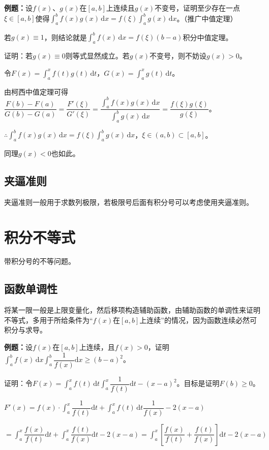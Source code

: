 \documentclass[UTF8, 12pt]{ctexart}
\begin{document}
\textbf{例题：}设$f(x)$、$g(x)$在$[a,b]$上连续且$g(x)$不变号，证明至少存在一点$\xi\in[a,b]$使得$\int_a^bf(x)g(x)\,\textrm{d}x=f(\xi)\int_a^bg(x)\,\textrm{d}x$。（推广中值定理）

若$g(x)\equiv1$，则结论就是$\int_a^bf(x)\,\textrm{d}x=f(\xi)(b-a)$积分中值定理。

证明：若$g(x)\equiv0$则等式显然成立。若$g(x)$不变号，则不妨设$g(x)>0$。

令$F(x)=\int_a^xf(t)g(t)\,\textrm{d}t$，$G(x)=\int_a^xg(t)\,\textrm{d}t$。

由柯西中值定理可得$\dfrac{F(b)-F(a)}{G(b)-G(a)}=\dfrac{F'(\xi)}{G'(\xi)}=\dfrac{\int_a^bf(x)g(x)\,\textrm{d}x}{\int_a^bg(x)\,\textrm{d}x}=\dfrac{f(\xi)g(\xi)}{g(\xi)}$。

$\therefore\int_a^bf(x)g(x)\,\textrm{d}x=f(\xi)\int_a^bg(x)\,\textrm{d}x$，$\xi\in(a,b)\subset[a,b]$。

同理$g(x)<0$也如此。

\subsection{夹逼准则}

夹逼准则一般用于求数列极限，若极限号后面有积分号可以考虑使用夹逼准则。

\section{积分不等式}

带积分号的不等问题。

\subsection{函数单调性}

将某一限一般是上限变量化，然后移项构造辅助函数，由辅助函数的单调性来证明不等式，多用于所给条件为“$f(x)$在$[a,b]$上连续”的情况，因为函数连续必然可积分与求导。

\textbf{例题：}设$f(x)$在$[a,b]$上连续，且$f(x)>0$，证明$\displaystyle{\int_a^bf(x)\,\textrm{d}x\int_a^b\dfrac{1}{f(x)}\textrm{d}x}\geqslant(b-a)^2$。

证明：令$F(x)=\displaystyle{\int_a^xf(t)\,\textrm{d}t\int_a^x\dfrac{1}{f(t)}\textrm{d}t-(x-a)^2}$。目标是证明$F(b)\geqslant0$。

$F'(x)=f(x)\cdot\displaystyle{\int_a^x\dfrac{1}{f(t)}\textrm{d}t+\int_a^xf(t)\,\textrm{d}t\dfrac{1}{f(x)}}-2(x-a)$

$=\displaystyle{\int_a^x\dfrac{f(x)}{f(t)}\textrm{d}t+\int_a^x\dfrac{f(t)}{f(x)}\textrm{d}t-2(x-a)=\int_a^x\left[\dfrac{f(x)}{f(t)}+\dfrac{f(t)}{f(x)}\right]\textrm{d}t-2(x-a)}$
\end{document}
